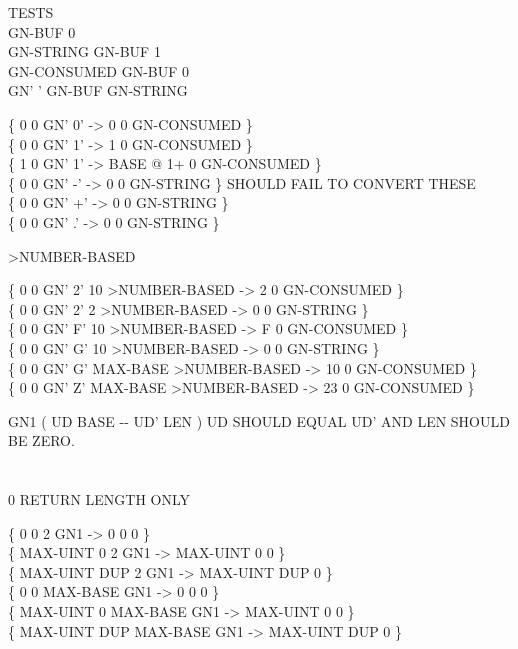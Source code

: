 \begin{tt}
  TESTS \\

 GN-BUF 0  \\
\word{:} GN-STRING	 GN-BUF 1 \word{;} \\
\word{:} GN-CONSUMED GN-BUF  0 \word{;} \\
\word{:} GN'		 \word{[CHAR]} '    GN-BUF   GN-STRING \word{;}

\{ 0 0 GN' 0'  ->         0 0 GN-CONSUMED \} \\
\{ 0 0 GN' 1'  ->         1 0 GN-CONSUMED \} \\
\{ 1 0 GN' 1'  -> BASE @ 1+ 0 GN-CONSUMED \} \\
\{ 0 0 GN' -'  ->         0 0 GN-STRING   \} \tab {} SHOULD FAIL TO CONVERT THESE \\
\{ 0 0 GN' +'  ->         0 0 GN-STRING   \} \\
\{ 0 0 GN' .'  ->         0 0 GN-STRING   \}

\word{:} >NUMBER-BASED \\
\tab {}    \word{!}    \word{!} \word{;}

\{ 0 0 GN' 2'       10 >NUMBER-BASED ->  2 0 GN-CONSUMED \} \\
\{ 0 0 GN' 2'        2 >NUMBER-BASED ->  0 0 GN-STRING   \} \\
\{ 0 0 GN' F'       10 >NUMBER-BASED ->  F 0 GN-CONSUMED \} \\
\{ 0 0 GN' G'       10 >NUMBER-BASED ->  0 0 GN-STRING   \} \\
\{ 0 0 GN' G' MAX-BASE >NUMBER-BASED -> 10 0 GN-CONSUMED \} \\
\{ 0 0 GN' Z' MAX-BASE >NUMBER-BASED -> 23 0 GN-CONSUMED \}

\word{:} GN1  ( UD BASE -{}- UD' LEN ) UD SHOULD EQUAL UD' AND LEN SHOULD BE ZERO. \\
\tab	{}    \word{!} \\
\tab	{}   \\
 0     \tab {} RETURN LENGTH ONLY \\
\tab	{}  \word{!} \word{;}

\{        0   0        2 GN1 ->        0   0 0 \} \\
\{ MAX-UINT   0        2 GN1 -> MAX-UINT   0 0 \} \\
\{ MAX-UINT DUP        2 GN1 -> MAX-UINT DUP 0 \} \\
\{        0   0 MAX-BASE GN1 ->        0   0 0 \} \\
\{ MAX-UINT   0 MAX-BASE GN1 -> MAX-UINT   0 0 \} \\
\{ MAX-UINT DUP MAX-BASE GN1 -> MAX-UINT DUP 0 \}


\end{tt}
